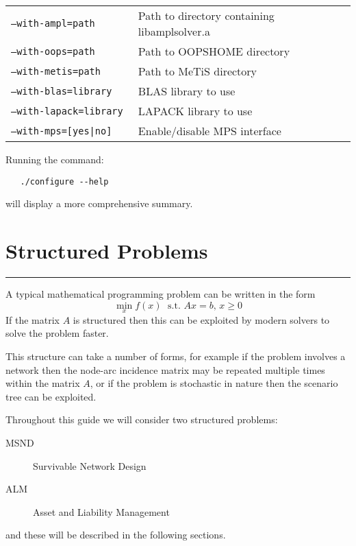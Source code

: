 \documentclass[10pt,a4paper]{book}
\begin{document}
\begin{tabular}{ll}
   \tt --with-ampl=path & Path to directory containing libamplsolver.a \\
   \tt --with-oops=path & Path to OOPSHOME directory \\
   \tt --with-metis=path & Path to MeTiS directory \\
   \tt --with-blas=library & BLAS library to use \\
   \tt --with-lapack=library & LAPACK library to use \\
   \tt --with-mps=[yes|no] & Enable/disable MPS interface
\end{tabular}

\noindent Running the command:
\begin{verbatim}
   ./configure --help
\end{verbatim}
will display a more comprehensive summary.

\chapter{Structured Problems}
\vspace{-0.6cm}\rule{\textwidth}{0.4ex}\vspace{0.1cm}
\label{background}

A typical mathematical programming problem can be written in the form
\begin{equation}
\min_x f(x)\; \text{~s.t.~} Ax=b,\, x\ge 0
\end{equation}
If the matrix $A$ is structured then this can be exploited by modern solvers
to solve the problem faster.

This structure can take a number of forms, for example if the problem involves
a network then the node-arc incidence matrix may be repeated multiple times
within the matrix $A$, or if the problem is stochastic in nature then the
scenario tree can be exploited.

Throughout this guide we will consider two structured problems:
\begin{description}
   \item[MSND] Survivable Network Design
   \item[ALM] Asset and Liability Management
\end{description}
and these will be described in the following sections.
\end{document}
